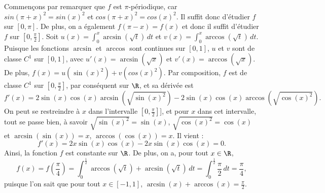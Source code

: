 Commençons par remarquer que $f$ est $\pi$-périodique, car $sin(\pi+x)^2=sin(x)^2$ et $cos(\pi+x)^2=cos(x)^2$. Il suffit donc d'étudier $f$ sur $[0,\pi]$. De plus, on a également $f(\pi-x)=f(x)$ et donc il suffit d'étudier $f$ sur $\left[0, \frac{\pi}{2} \right]$. Soit $u(x)=\int_0^x \arcsin(\sqrt{t}) \,dt$ et $v(x)=\int_0^x \arccos(\sqrt{t}) \,dt$. Puisque les fonctions $\arcsin$ et $\arccos$ sont continues sur $[0,1]$, $u$ et $v$ sont de classe $C^1$ sur $[0,1]$, avec $u'(x)=\arcsin(\sqrt{x})$ et $v'(x)=\arccos(\sqrt{x})$. De plus, $f(x)=u(\sin(x)^2)+v(cos(x)^2)$. Par composition, $f$ est de classe $C^1$ sur $\left[0,\frac{\pi}{2} \right]$, par conséquent sur $\R$, et sa dérivée est 
\[ f'(x)=2\sin(x) \cos(x) \arcsin(\sqrt{\sin(x)^2}) - 2\sin(x) \cos(x) \arccos(\sqrt{\cos(x)^2}).\]
On peut se restreindre à $x$ dans l'intervalle $\left[ 0 ,\frac{\pi}{2} \right]$], et pour $x$ dans cet intervalle, tout se passe bien, à savoir $\sqrt{\sin(x)^2}=\sin(x)$, $\sqrt{\cos(x)^2}=\cos(x)$ et $\arcsin(\sin(x))=x$, $\arccos(\cos(x))=x$. Il vient :
\[ f'(x)=2x\sin(x)\cos(x)-2x\sin(x)\cos(x)=0.\] Ainsi, la fonction $f$ est constante sur $\R$. De plus, on a, pour tout $x \in \R$, 
\[ f(x)=f \left( \frac{\pi}{4} \right) =  \int_0^{\frac{1}{2}} \arccos(\sqrt{t}) + \arcsin(\sqrt{t}) \, dt= \int_0^{\frac{1}{2}} \frac{\pi}{2} \, dt = \frac{\pi}{4},\]
puisque l'on sait que pour tout $x \in [-1,1]$, $\arcsin(x)+\arccos(x)= \frac{\pi}{2}$.